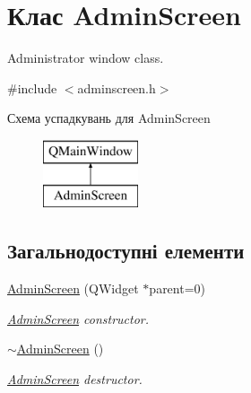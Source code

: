 \hypertarget{classAdminScreen}{\section{Клас Admin\-Screen}
\label{classAdminScreen}
}


Administrator window class.  




{\ttfamily \#include $<$adminscreen.\-h$>$}

Схема успадкувань для Admin\-Screen\begin{figure}[H]
\begin{center}
\leavevmode
\includegraphics[height=2.000000cm]{classAdminScreen}
\end{center}
\end{figure}
\subsection*{Загальнодоступні елементи}
\begin{DoxyCompactItemize}
\item 
\hyperlink{classAdminScreen_afacdce9a29c025265097914529ff5619}{Admin\-Screen} (Q\-Widget $\ast$parent=0)
\begin{DoxyCompactList}\small\item\em \hyperlink{classAdminScreen}{Admin\-Screen} constructor. \end{DoxyCompactList}\item 
\hypertarget{classAdminScreen_afaf1ed51e4a07af841c11f0f354ad2ed}{\hyperlink{classAdminScreen_afaf1ed51e4a07af841c11f0f354ad2ed}{$\sim$\-Admin\-Screen} ()}\label{classAdminScreen_afaf1ed51e4a07af841c11f0f354ad2ed}

\begin{DoxyCompactList}\small\item\em \hyperlink{classAdminScreen}{Admin\-Screen} destructor. \end{DoxyCompactList}\end{DoxyCompactItemize}
